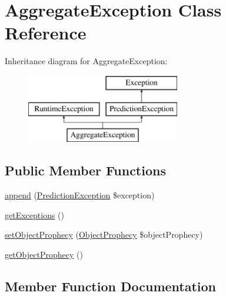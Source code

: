 \hypertarget{class_prophecy_1_1_exception_1_1_prediction_1_1_aggregate_exception}{}\section{Aggregate\+Exception Class Reference}
\label{class_prophecy_1_1_exception_1_1_prediction_1_1_aggregate_exception}
Inheritance diagram for Aggregate\+Exception\+:\begin{figure}[H]
\begin{center}
\leavevmode
\includegraphics[height=3.000000cm]{class_prophecy_1_1_exception_1_1_prediction_1_1_aggregate_exception}
\end{center}
\end{figure}
\subsection*{Public Member Functions}
\begin{DoxyCompactItemize}
\item 
\mbox{\hyperlink{class_prophecy_1_1_exception_1_1_prediction_1_1_aggregate_exception_adbc862db3a9bdf18364a9ca03b749054}{append}} (\mbox{\hyperlink{interface_prophecy_1_1_exception_1_1_prediction_1_1_prediction_exception}{Prediction\+Exception}} \$exception)
\item 
\mbox{\hyperlink{class_prophecy_1_1_exception_1_1_prediction_1_1_aggregate_exception_af9d088fef34b6b110d9a272eebe6a72e}{get\+Exceptions}} ()
\item 
\mbox{\hyperlink{class_prophecy_1_1_exception_1_1_prediction_1_1_aggregate_exception_a452ce285c1456d5f97a4b90a73fa86ce}{set\+Object\+Prophecy}} (\mbox{\hyperlink{class_prophecy_1_1_prophecy_1_1_object_prophecy}{Object\+Prophecy}} \$object\+Prophecy)
\item 
\mbox{\hyperlink{class_prophecy_1_1_exception_1_1_prediction_1_1_aggregate_exception_a1cff2ecad65e616019de966935f0fe94}{get\+Object\+Prophecy}} ()
\end{DoxyCompactItemize}


\subsection{Member Function Documentation}
\mbox{\label{class_prophecy_1_1_exception_1_1_prediction_1_1_aggregate_exception_adbc862db3a9bdf18364a9ca03b749054}} 
